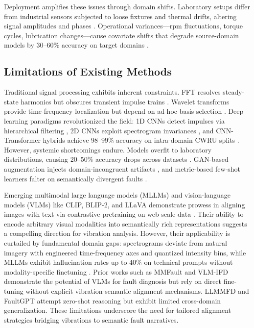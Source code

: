 Deployment amplifies these issues through domain shifts. Laboratory setups differ from industrial sensors subjected to loose fixtures and thermal drifts, altering signal amplitudes and phases \cite{cite25}. Operational variances—rpm fluctuations, torque cycles, lubrication changes—cause covariate shifts that degrade source-domain models by 30--60\% accuracy on target domains \cite{cite9}\cite{cite26}.

\subsection{Limitations of Existing Methods}

Traditional signal processing exhibits inherent constraints. FFT resolves steady-state harmonics but obscures transient impulse trains \cite{cite10}. Wavelet transforms provide time-frequency localization but depend on ad-hoc basis selection \cite{cite11}. Deep learning paradigms revolutionized the field: 1D CNNs detect impulses via hierarchical filtering \cite{cite12}, 2D CNNs exploit spectrogram invariances \cite{cite13}, and CNN-Transformer hybrids achieve 98--99\% accuracy on intra-domain CWRU splits \cite{cite15}. However, systemic shortcomings endure. Models overfit to laboratory distributions, causing 20--50\% accuracy drops across datasets \cite{cite17}. GAN-based augmentation injects domain-incongruent artifacts \cite{cite18}, and metric-based few-shot learners falter on semantically divergent faults \cite{cite19}.

Emerging multimodal large language models (MLLMs) and vision-language models (VLMs) like CLIP, BLIP-2, and LLaVA demonstrate prowess in aligning images with text via contrastive pretraining on web-scale data \cite{cite20}\cite{cite21}. Their ability to encode arbitrary visual modalities into semantically rich representations suggests a compelling direction for vibration analysis. However, their applicability is curtailed by fundamental domain gaps: spectrograms deviate from natural imagery with engineered time-frequency axes and quantized intensity bins, while MLLMs exhibit hallucination rates up to 40\% on technical prompts without modality-specific finetuning \cite{cite27}\cite{cite28}\cite{cite29}. Prior works such as MMFault \cite{cite23} and VLM-IFD \cite{cite24} demonstrate the potential of VLMs for fault diagnosis but rely on direct fine-tuning without explicit vibration-semantic alignment mechanisms. LLMMFD \cite{cite25} and FaultGPT \cite{cite26} attempt zero-shot reasoning but exhibit limited cross-domain generalization. These limitations underscore the need for tailored alignment strategies bridging vibrations to semantic fault narratives.

